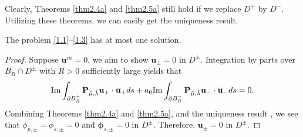 \documentclass[final,reqno]{siamltex}
\newcommand{\om}{\omega}
\newcommand{\pa}{\partial}
\newcommand{\ov}{\overline}
\newcommand{\I}{{\rm Im}}
\newcommand{\be}{\begin{eqnarray}}
\newcommand{\ben}{\begin{eqnarray*}}
\newcommand{\en}{\end{eqnarray}}
\newcommand{\enn}{\end{eqnarray*}}
\begin{document}
Clearly, Theorems \ref{thm2.4a} and \ref{thm2.5a} still hold if we replace $D^+$ by $D^-$. Utilizing these theorems, we can easily get the uniqueness result. 

\begin{theorem}\label{thm2.4}
	The problem \eqref{1.1}--\eqref{1.3} has at most one solution. 
\end{theorem}
\begin{proof}
	Suppose $\mathbf{u}^{in}=0$, we aim to show $\mathbf{u}_\pm=0$ in $D^\pm$. Integration by parts over $B_R\cap D^\pm$ with $R>0$ sufficiently large yields that 
	$$
	  \I\int_{\pa B_R^+}\mathbf{P}_{\tilde{\mu},\tilde{\lambda}}\mathbf{u_+}\cdot\mathbf{\ov u_+}ds+a_0\I\int_{\pa B_R^-}\mathbf{P}_{\tilde{\mu},\tilde{\lambda}}\mathbf{u_-}\cdot\mathbf{\ov u_-}ds=0. 
	$$
	Combining Theorems \ref{thm2.4a} and \ref{thm2.5a}, and the uniqueness result \cite[Proposition 2.1]{PC98}, we see that $\phi_{p,\pm}=\phi_{s,\pm}=0$ and $\boldsymbol{\phi}_{s,\pm}=0$ in $D^\pm$. Therefore, $\mathbf{u}_\pm=0$ in $D^\pm$. 

\end{proof}
\end{document}
